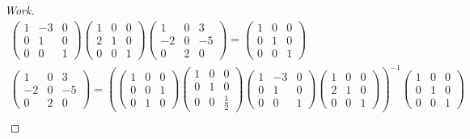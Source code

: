 \documentclass{article}
\begin{document}
\begin{proof}[Work]
\begin{align*}
\begin{pmatrix}
      1 & -3 & 0 \\
      0 & 1  & 0 \\
      0 & 0  & 1
    \end{pmatrix}
    \begin{pmatrix}
      1 & 0 & 0 \\
      2 & 1 & 0 \\
      0 & 0 & 1
    \end{pmatrix}
    \begin{pmatrix}
      1  & 0 & 3  \\
      -2 & 0 & -5 \\
      0  & 2 & 0
    \end{pmatrix} =
    \begin{pmatrix}
      1 & 0 & 0 \\
      0 & 1 & 0 \\
      0 & 0 & 1
    \end{pmatrix}     \\
    \begin{pmatrix}
      1  & 0 & 3  \\
      -2 & 0 & -5 \\
      0  & 2 & 0
    \end{pmatrix} = \left(
    \begin{pmatrix}
      1 & 0 & 0 \\
      0 & 0 & 1 \\
      0 & 1 & 0
    \end{pmatrix}
    \begin{pmatrix}
      1 & 0 & 0           \\
      0 & 1 & 0           \\
      0 & 0 & \frac{1}{2}
    \end{pmatrix}
    \begin{pmatrix}
      1 & -3 & 0 \\
      0 & 1  & 0 \\
      0 & 0  & 1
    \end{pmatrix}
    \begin{pmatrix}
      1 & 0 & 0 \\
      2 & 1 & 0 \\
      0 & 0 & 1
    \end{pmatrix}
    \right)^{-1}
    \begin{pmatrix}
      1 & 0 & 0 \\
      0 & 1 & 0 \\
      0 & 0 & 1
    \end{pmatrix}     \\

\end{align*}
\end{proof}
\end{document}
